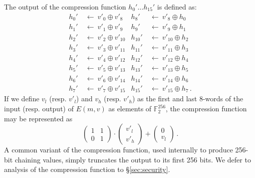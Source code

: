\documentclass[12pt,notitlepage,a4paper]{article}
\begin{document}
The output of the compression function $h_{0}' \ldots h_{15}'$ is
defined as:
\begin{align*}
h_{0}'  \ & \leftarrow \ v'_{0} \oplus  v'_{8} &
h_{8}'  \ & \leftarrow \ v'_{8} \oplus  h_{0} \\
h_{1}'  \ & \leftarrow \ v'_{1} \oplus  v'_{9} &
h_{9}'  \ & \leftarrow \ v'_{9} \oplus  h_{1} \\
h_{2}'  \ & \leftarrow \ v'_{2} \oplus  v'_{10} &
h_{10}' \ & \leftarrow \ v'_{10} \oplus  h_{2} \\
h_{3}'  \ & \leftarrow \ v'_{3} \oplus  v'_{11} &
h_{11}' \ & \leftarrow \ v'_{11} \oplus  h_{3} \\
h_{4}'  \ & \leftarrow \ v'_{4} \oplus  v'_{12} &
h_{12}' \ & \leftarrow \ v'_{12} \oplus  h_{4} \\
h_{5}'  \ & \leftarrow \ v'_{5} \oplus  v'_{13} &
h_{13}' \ & \leftarrow \ v'_{13} \oplus  h_{5} \\
h_{6}'  \ & \leftarrow \ v'_{6} \oplus  v'_{14} &
h_{14}' \ & \leftarrow \ v'_{14} \oplus  h_{6} \\
h_{7}'  \ & \leftarrow \ v'_{7} \oplus  v'_{15} &
h_{15}' \ & \leftarrow \ v'_{15} \oplus  h_{7}\,.
\end{align*}
If we define $v_l$ (resp. $v'_l$) and $v_h$ (resp. $v'_h$) as the first and last 8-words of the input (resp. output) of $E(m, v)$ as elements of $\mathbb{F}_2^{256}$, the compression function may be represented as 
\[
  \begin{pmatrix}
    1 & 1 \\
    0 & 1
  \end{pmatrix}\cdot%
  \begin{pmatrix}
  v'_l \\ v'_h
  \end{pmatrix} + 
  \begin{pmatrix}
   0 \\ v_l
  \end{pmatrix}\,.
\]
A common variant of the compression function, used internally to produce 256-bit chaining values, simply truncates the output to its first 256 bits. We defer to analysis of the compression function to \S\ref{sec:security}.
\end{document}
